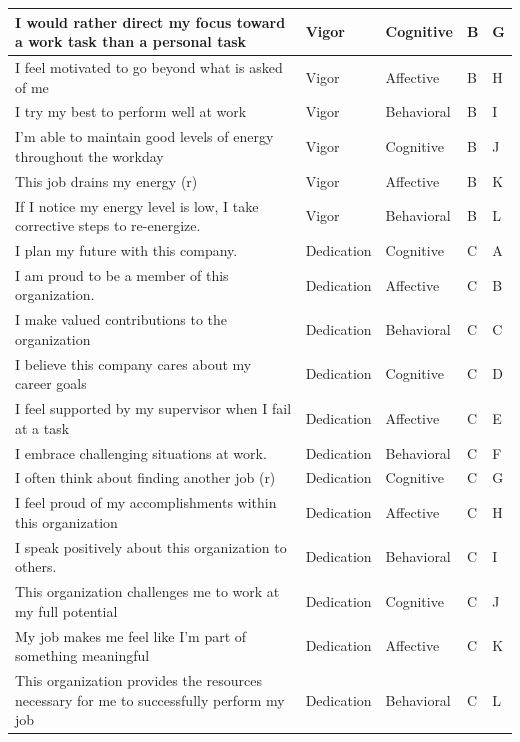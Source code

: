 \documentclass[
]{book}
\begin{document}
\begin{table}
\begin{tabular}[t]{l|l|l|l|l}
\hline
I would rather direct my focus toward a work task than a personal task & Vigor & Cognitive & B & G\\
\hline
I feel motivated to go beyond what is asked of me & Vigor & Affective & B & H\\
\hline
I try my best to perform well at work & Vigor & Behavioral & B & I\\
\hline
I’m able to maintain good levels of energy throughout the workday & Vigor & Cognitive & B & J\\
\hline
This job drains my energy (r) & Vigor & Affective & B & K\\
\hline
If I notice my energy level is low, I take corrective steps to re-energize. & Vigor & Behavioral & B & L\\
\hline
I plan my future with this company. & Dedication & Cognitive & C & A\\
\hline
I am proud to be a member of this organization. & Dedication & Affective & C & B\\
\hline
I make valued contributions to the organization & Dedication & Behavioral & C & C\\
\hline
I believe this company cares about my career goals & Dedication & Cognitive & C & D\\
\hline
I feel supported by my supervisor when I fail at a task & Dedication & Affective & C & E\\
\hline
I embrace challenging situations at work. & Dedication & Behavioral & C & F\\
\hline
I often think about finding another job (r) & Dedication & Cognitive & C & G\\
\hline
I feel proud of my accomplishments within this organization & Dedication & Affective & C & H\\
\hline
I speak positively about this organization to others. & Dedication & Behavioral & C & I\\
\hline
This organization challenges me to work at my full potential & Dedication & Cognitive & C & J\\
\hline
My job makes me feel like I’m part of something meaningful & Dedication & Affective & C & K\\
\hline
This organization provides the resources necessary for me to successfully perform my job & Dedication & Behavioral & C & L\\
\hline
\end{tabular}
\end{table}
\end{document}
